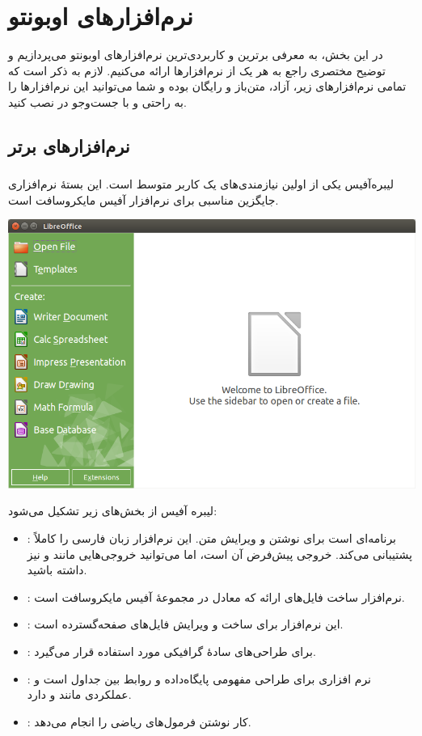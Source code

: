 \chapter{نرم‌افزارهای اوبونتو}
در این بخش، به معرفی برترین و کاربردی‌ترین نرم‌افزارهای اوبونتو می‌پردازیم و توضیح مختصری راجع به هر یک از نرم‌افزارها ارائه می‌کنیم. لازم به ذکر است که تمامی نرم‌افزارهای زیر، آزاد، متن‌باز و رایگان بوده و شما می‌توانید این نرم‌افزارها را به راحتی و با جست‌و‌جو در  نصب کنید.


\section{نرم‌افزارهای برتر}
\subsection[LibreOffice]{}
لیبره‌آفیس یکی از اولین نیازمندی‌های یک کاربر متوسط است. این بستهٔ نرم‌افزاری جایگزین مناسبی برای نرم‌افزار آفیس مایکروسافت است.
\begin{center}
\includegraphics[scale=0.46]{pics/40.png}
\end{center}

لیبره آفیس از بخش‌های زیر تشکیل می‌شود:
\begin{itemize}
\item {}: برنامه‌ای است برای نوشتن و ویرایش متن. این نرم‌افزار زبان فارسی را کاملاً پشتیبانی می‌کند. خروجی پیش‌فرض آن  است، اما می‌توانید خروجی‌هایی مانند  و  نیز داشته باشید.
\item {}: نرم‌افزار ساخت فایل‌های ارائه که معادل  در مجموعهٔ آفیس مایکروسافت است.
\item {}: این نرم‌افزار برای ساخت و ویرایش فایل‌های صفحه‌گسترده است.
\item {}: برای طراحی‌های سادهٔ گرافیکی مورد استفاده قرار می‌گیرد.
\item {}: نرم افزاری برای طراحی مفهومی پایگاه‌داده و روابط بین جداول است و عملکردی مانند  و  دارد.
\item {}: کار نوشتن فرمول‌های ریاضی را انجام می‌دهد.
\end{itemize}

